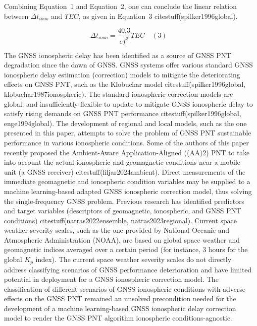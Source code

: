 \let\LaTeXcline\cline\documentclass[sn-mathphys-num]{sn-jnl}\let\cline\LaTeXcline
\begin{document}
Combining Equation~1 and Equation~2, one can conclude the linear relation between $\Delta t_{iono}$ and $TEC$, as given in Equation~3 citestuff(spilker1996global).

\begin{equation}
	\Delta t_{iono} = \frac{40.3}{c f^{2}} TEC
	\quad\left(3\right)
\end{equation}

The GNSS ionospheric delay has been identified as a source of GNSS PNT degradation since the dawn of GNSS. GNSS systems offer various standard GNSS ionospheric delay estimation (correction) models to mitigate the deteriorating effects on GNSS PNT, such as the Klobuchar model citestuff(spilker1996global, klobuchar1987ionospheric). The standard ionospheric correction models are global, and insufficiently flexible to update to mitigate GNSS ionospheric delay to satisfy rising demands on GNSS PNT performance citestuff(spilker1996global, enge1994global). The development of regional and local models, such as the one presented in this paper, attempts to solve the problem of GNSS PNT sustainable performance in various ionospheric conditions. Some of the authors of this paper recently proposed the Ambient-Aware Application-Aligned ((AA)2) PNT to take into account the actual ionospheric and geomagnetic conditions near a mobile unit (a GNSS receiver) citestuff(filjar2024ambient). Direct measurements of the immediate geomagnetic and ionospheric condition variables may be supplied to a machine learning-based adapted GNSS ionospheric correction model, thus solving the single-frequency GNSS problem. Previous research has identified predictors and target variables (descriptors of geomagnetic, ionospheric, and GNSS PNT conditions) citestuff(natras2022ensemble, natras2023regional). Current space weather severity scales, such as the one provided by National Oceanic and Atmospheric Administration (NOAA), are based on global space weather and geomagnetic indices averaged over a certain period (for instance, $3$ hours for the global $K_{p}$ index). The current space weather severity scales do not directly address classifying scenarios of GNSS performance deterioration and have limited potential in deployment for a GNSS ionospheric correction model. The classification of different scenarios of GNSS ionospheric conditions with adverse effects on the GNSS PNT remained an unsolved precondition needed for the development of a machine learning-based GNSS ionospheric delay correction model to render the GNSS PNT algorithm ionospheric conditions-agnostic.
\end{document}
